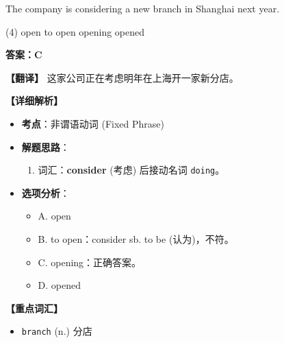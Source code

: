 \documentclass[11pt, a4paper]{article}
\newcommand{\analysis}[4]{
    \begin{solutionbox}
        \textbf{答案：#1}
        
        \textbf{【翻译】} #2
        
        \textbf{【详细解析】}
        #3
        
        \textbf{【重点词汇】}
        #4
    \end{solutionbox}
}
\newcommand{\blank}{\underline{\hspace{1.5cm}}}
\begin{document}
\begin{questions}
    \item The company is considering \blank a new branch in Shanghai next year.
    \begin{tasks}(4)
        \task open \task to open \task opening \task opened
    \end{tasks}
    \analysis{C}{这家公司正在考虑明年在上海开一家新分店。}{
        \begin{itemize}
            \item \textbf{考点}：非谓语动词 (Fixed Phrase)
            \item \textbf{解题思路}：
                \begin{enumerate}
                    \item 词汇：\textbf{consider} (考虑) 后接动名词 \texttt{doing}。
                \end{enumerate}
            \item \textbf{选项分析}：
                \begin{itemize}
                    \item A. open
                    \item B. to open：consider sb. to be (认为)，不符。
                    \item C. opening：正确答案。
                    \item D. opened
                \end{itemize}
        \end{itemize}
    }{
        \begin{itemize}
            \item \texttt{branch} (n.) 分店
        \end{itemize}
    }


\end{questions}
\end{document}
